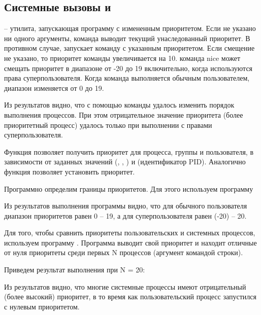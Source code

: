 \subsection{Системные вызовы  и }

 -- утилита, запускающая программу с измененным приоритетом. Если не указано ни одного аргументы, команда выводит текущий унаследованный приоритет. В противном случае,  запускает команду с указанным приоритетом. Если смещение не указано, то приоритет команды увеличивается на 10. команда nice может смещать приоритет в диапазоне от -20 до 19 включительно, когда используются права суперпользователя. Когда команда выполняется обычным пользователем, диапазон изменяется от 0 до 19.



Из результатов видно, что с помощью команды  удалось изменить порядок выполнения процессов. При этом отрицательное значение приоритета (более приоритетный процесс) удалось только при выполнении с правами суперпользователя.

Функция  позволяет получить приоритет для процесса, группы и пользователя, в зависимости от заданных значений  (, , ) и  (идентификатор PID). Аналогично функция  позволяет установить приоритет. 

Программно определим границы приоритетов. Для этого используем программу 



Из результатов выполнения программы видно, что для обычного пользователя диапазон приоритетов равен 0 -- 19, а для суперпользователя равен (-20) -- 20.


Для того, чтобы сравнить приоритеты пользовательских и системных процессов, используем программу . Программа выводит свой приоритет и находит отличные от нуля приоритеты среди первых N процессов (аргумент командой строки).



Приведем результат выполнения при N = 20:


Из результатов видно, что многие системные процессы имеют отрицательный (более высокий) приоритет, в то время как пользовательский процесс запустился с нулевым приоритетом.

